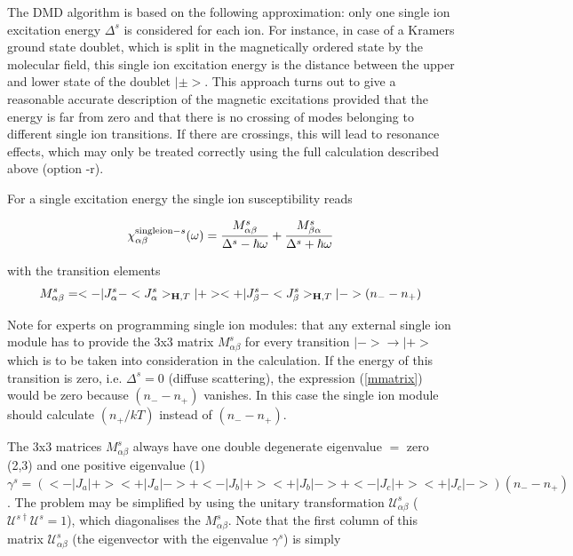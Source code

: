  The DMD algorithm is
  based on the following approximation:
  only one single ion excitation energy
$\Delta^s$ is considered for each ion. For instance, in case of a Kramers ground state
doublet, which is split in the magnetically ordered state by the molecular
field, this single ion excitation energy is the distance between the upper
and lower state of the doublet $|\pm>$.
 This approach turns out to 
give a reasonable accurate description of the magnetic excitations provided
that the energy is far from zero and that there is no crossing of modes
belonging to different single ion transitions. If there are crossings, this will lead to
resonance effects, which may only be treated correctly using the full calculation
described above (option {\prg -r}).

For a single excitation energy the single ion susceptibility
reads

\begin{equation}
\chi^{{\rm single ion-} s}_{\alpha\beta}(\omega)=
\frac{M^s_{\alpha\beta}}{\Delta^s-\hbar \omega}+
\frac{M^s_{\beta\alpha}}{\Delta^s+\hbar \omega}
\end{equation}

with the transition elements
\begin{equation}\label{mmatrix}
M^s_{\alpha\beta}=<-|J^s_{\alpha}-<J^s_{\alpha}>_{\mathbf H,T}|+><+|J^s_{\beta}-<J^s_{\beta}>_{\mathbf H,T}|->
(n_--n_+)
\end{equation}

{\tiny Note for experts on programming single ion modules: that any external single ion module has to provide the 3x3 %
matrix $M^s_{\alpha\beta}$ for every transition
$|-> \rightarrow |+>$which is to be taken into consideration in the calculation. If the energy of this transition
is zero, i.e. $\Delta^s=0$ (diffuse scattering), the expression (\ref{mmatrix}) would be zero because $(n_--n_+)$ %
vanishes.
In this case the single ion module should calculate $(n_+/kT)$ instead of $(n_--n_+)$.
}
   
 The 3x3 matrices $M^s_{\alpha\beta}$
always have one double degenerate eigenvalue $=$ zero (2,3) and one 
positive eigenvalue (1)
$\gamma^s=(<-|J_a|+><+|J_a|->
+<-|J_b|+><+|J_b|->
+<-|J_c|+><+|J_c|->)(n_--n_+)$. 
The  problem  may be simplified by using
the unitary transformation ${\mathcal U^s_{\alpha\beta}}$ (${\mathcal U^{s\dag}\mathcal U^s}=1$), which diagonalises the %
$M^s_{\alpha\beta}$. Note that the first column of this matrix ${\mathcal U^s_{\alpha\beta}}$ (the eigenvector with the %
eigenvalue $\gamma^s$) is simply 

